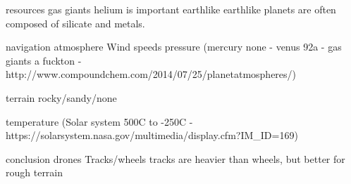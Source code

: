 resources
    gas giants
        helium is important
    earthlike
        earthlike planets are often composed of silicate and metals.


navigation
    atmosphere
        Wind speeds
        pressure (mercury none - venus 92a - gas giants a fuckton - http://www.compoundchem.com/2014/07/25/planetatmospheres/)

    terrain
        rocky/sandy/none

    temperature (Solar system 500C to -250C - https://solarsystem.nasa.gov/multimedia/display.cfm?IM_ID=169)
    
conclusion
    drones
    Tracks/wheels
        tracks are heavier than wheels, but better for rough terrain

